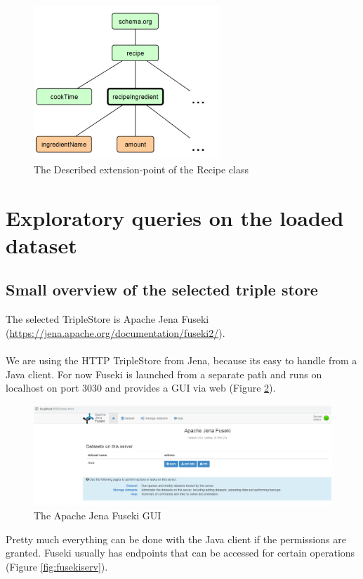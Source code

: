 \documentclass{article}
\begin{document}
\begin{figure}[H]
  \centering
  \includegraphics[width=7cm]{pictures/voc_ext.png}
  \caption{The Described extension-point of the Recipe class}
  \label{fig:vocext}
\end{figure}
\newpage

\section{Exploratory queries on the loaded dataset}
\subsection{Small overview of the selected triple store}
The selected TripleStore is Apache Jena  Fuseki (\url{https://jena.apache.org/documentation/fuseki2/}). \\ \\
We are using the HTTP TripleStore from Jena, because its easy to handle from a Java client. For now Fuseki is launched from a separate path and runs on localhost on port 3030 and provides a GUI via web (Figure \ref{fig:fuseki}). 

\begin{figure}[H]
  \centering
  \includegraphics[width=12cm]{pictures/fuseki.png}
  \caption{The Apache Jena Fuseki GUI}
  \label{fig:fuseki}
\end{figure}
\noindent
Pretty much everything can be done with the Java client if the permissions are granted. Fuseki usually has endpoints that can be accessed for certain operations (Figure \ref{fig:fusekiserv}). \\
\end{document}

